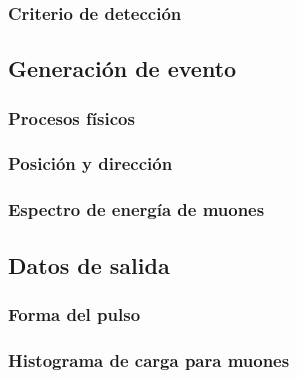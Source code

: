 \documentclass{book}
\begin{document}
\subsubsection{Criterio de detecci\'on}

\subsection{Generaci\'on de evento}
\subsubsection{Procesos f\'isicos}
\subsubsection{Posici\'on y direcci\'on}
\subsubsection{Espectro de energ\'ia de muones}

\subsection{Datos de salida}
\subsubsection{Forma del pulso}
\subsubsection{Histograma de carga para muones}




\end{document}
